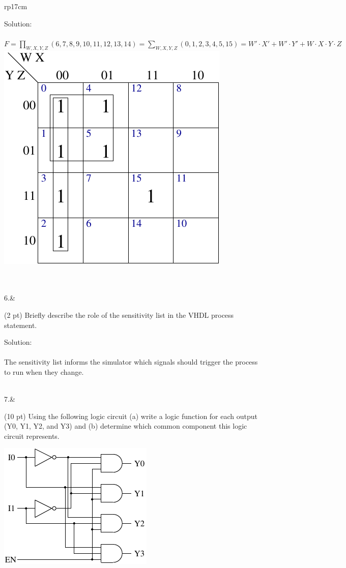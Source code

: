 \documentclass{article}
\begin{document}
\begin{longtable}[l]{rp{17cm}}
\begin{minipage}[t]{\linewidth}
Solution: \\ \\
$F=\prod_{W,X,Y,Z}(6,7,8,9,10,11,12,13,14)=\sum_{W,X,Y,Z}(0,1,2,3,4,5,15)=W' \cdot X' + W' \cdot Y' + W \cdot X \cdot Y \cdot Z$\\
\includegraphics{../CombinationalCircuits/Assessments/4VariableKMapExam}\\ \\
\end{minipage}\\
\medskip
6.&\begin{minipage}[t]{\linewidth}(2 pt) Briefly describe the role of the sensitivity list in the VHDL process statement.

Solution: \\ \\
The sensitivity list informs the simulator which signals should trigger the process to run when they change.
\end{minipage}\\
\medskip
7.&\begin{minipage}[t]{\linewidth}(10 pt) Using the following logic circuit (a) write a logic function for each output (Y0, Y1, Y2, and Y3) and (b) determine which common component this logic circuit represents.\\
\begin{center}
  \includegraphics{../Decoders/Assessments/2to4BinaryDecoderLogic} \\
\end{center}


\end{minipage}
\end{longtable}
\end{document}
